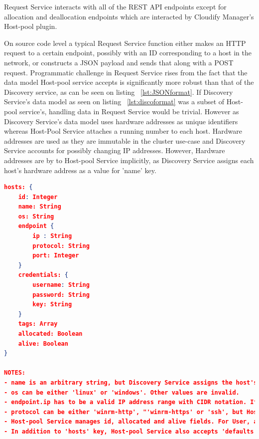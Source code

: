 Request Service interacts with all of the REST API endpoints except for allocation and deallocation endpoints which are interacted by Cloudify Manager's Host-pool plugin.

On source code level a typical Request Service function either makes an HTTP request to a certain endpoint, possibly with an ID corresponding to a host in the network, or constructs a JSON payload and sends that along with a POST request. Programmatic challenge in Request Service rises from the fact that the data model Host-pool service accepts is significantly more robust than that of the Discovery service, as can be seen on listing ~\ref{lst:JSONformat}. If Discovery Service's data model as seen on listing ~\ref{lst:discoformat} was a subset of Host-pool service's, handling data in Request Service would be trivial. However as Discovery Service's data model uses hardware addresses as unique identifiers whereas Host-Pool Service attaches a running number to each host. Hardware addresses are used as they are immutable in the cluster use-case and Discovery Service accounts for possibly changing IP addresses. However, Hardware addresses are by to Host-pool Service implicitly, as Discovery Service assigns each host's hardware address as a value for 'name' key. 

\begin{lstlisting}[language=json,firstnumber=1, caption={JSON schema accepted by the Host-pool Service for a single host}, captionpos=b, label=lst:JSONformat]
hosts: {
	id: Integer
	name: String
	os: String
	endpoint {
		ip : String
		protocol: String
		port: Integer	
	}
	credentials: {
		username: String
		password: String
		key: String
	}
	tags: Array
	allocated: Boolean
	alive: Boolean
}

NOTES:
- name is an arbitrary string, but Discovery Service assigns the host's hardware address as the value of name.
- os can be either 'linux' or 'windows'. Other values are invalid.
- endpoint.ip has to be a valid IP address range with CIDR notation. If a range is defined, Host-pool Service considers each unique IP address a single host.
- protocol can be either 'winrm-http', "'winrm-https' or 'ssh', but Host-pool service does not explicitly force this.
- Host-pool Service manages id, allocated and alive fields. For User, all other fields except credentials.password, credentials.key and tags are obligatory.
- In addition to 'hosts' key, Host-pool Service also accepts 'defaults' key. 'defaults' can contain the same keys as 'hosts'. If 'defaults' is provided, its values are appended to each host which has respective undefined values. id, allocated and alive cannot be provided as defaults.

\end{lstlisting}

